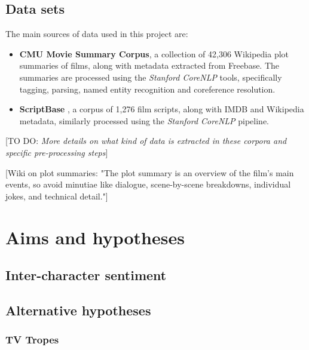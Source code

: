 \documentclass[bsc,frontabs,singlespacing,parskip]{infthesis} %
\begin{document}
\section{Data sets} \label{sec:data sets}
The main sources of data used in this project are:
\begin{itemize}
	\item \textbf{CMU Movie Summary Corpus}, a collection of 42,306 Wikipedia plot summaries of films, along with metadata extracted from Freebase. The summaries are processed using the \textit{Stanford CoreNLP} tools, specifically tagging, parsing, named entity recognition and coreference resolution.
	\item \textbf{ScriptBase} \cite{Gorinski2015}, a corpus of 1,276 film scripts, along with IMDB and Wikipedia metadata, similarly processed using the \textit{Stanford CoreNLP} pipeline.
\end{itemize}

[TO DO: \textit{More details on what kind of data is extracted in these corpora and specific pre-processing steps}]

[Wiki on plot summaries: "The plot summary is an overview of the film's main events, so avoid minutiae like dialogue, scene-by-scene breakdowns, individual jokes, and technical detail."]

\chapter{Aims and hypotheses}

\section{Inter-character sentiment}

\section{Alternative hypotheses}

\subsection{TV Tropes}
\end{document}
